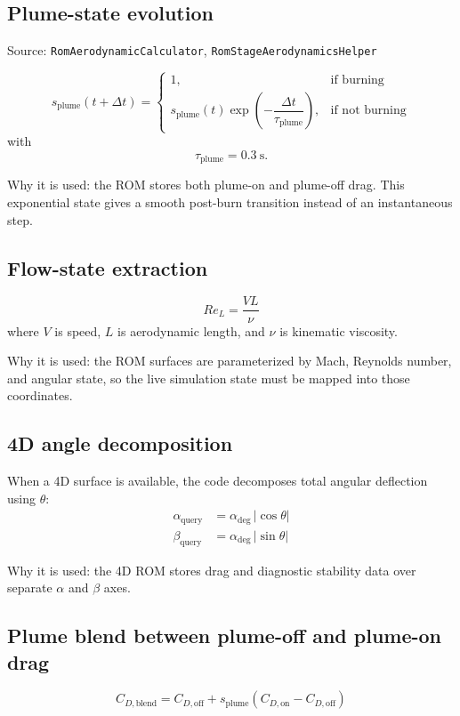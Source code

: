 \documentclass[11pt]{article}
\begin{document}
\subsection{Plume-state evolution}
Source: \texttt{RomAerodynamicCalculator}, \texttt{RomStageAerodynamicsHelper}

\begin{equation*}
s_{\mathrm{plume}}(t+\Delta t) =
\begin{cases}
1, & \text{if burning} \\
s_{\mathrm{plume}}(t)\exp\!\left(-\dfrac{\Delta t}{\tau_{\mathrm{plume}}}\right), & \text{if not burning}
\end{cases}
\end{equation*}
with
\[
\tau_{\mathrm{plume}} = 0.3\ \mathrm{s}.
\]

Why it is used: the ROM stores both plume-on and plume-off drag. This exponential state gives a smooth post-burn transition instead of an instantaneous step.

\subsection{Flow-state extraction}
\begin{equation*}
Re_L = \frac{V L}{\nu}
\end{equation*}
where $V$ is speed, $L$ is aerodynamic length, and $\nu$ is kinematic viscosity.

Why it is used: the ROM surfaces are parameterized by Mach, Reynolds number, and angular state, so the live simulation state must be mapped into those coordinates.

\subsection{4D angle decomposition}
When a 4D surface is available, the code decomposes total angular deflection using $\theta$:
\begin{align*}
\alpha_{\mathrm{query}} &= \alpha_{\deg}\,|\cos\theta| \\
\beta_{\mathrm{query}} &= \alpha_{\deg}\,|\sin\theta|
\end{align*}

Why it is used: the 4D ROM stores drag and diagnostic stability data over separate $\alpha$ and $\beta$ axes.

\subsection{Plume blend between plume-off and plume-on drag}
\begin{equation*}
C_{D,\mathrm{blend}} = C_{D,\mathrm{off}} + s_{\mathrm{plume}}\left(C_{D,\mathrm{on}} - C_{D,\mathrm{off}}\right)
\end{equation*}
\end{document}

